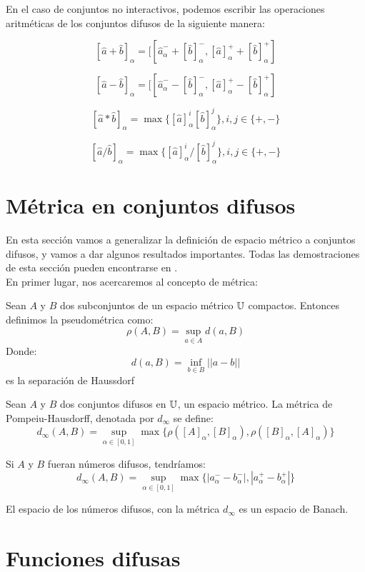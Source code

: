 \begin{ejemplo}
En el caso de conjuntos no interactivos, podemos escribir las operaciones aritméticas de los conjuntos difusos de la siguiente manera:

\[
[\hat{a} + \hat{b}]_\alpha = [[\hat{a}^-_\alpha + [\hat{b}]_\alpha^-, [\hat{a}]^+_\alpha + [\hat{b}]_\alpha^+]
\]

\[
[\hat{a} - \hat{b}]_\alpha = [[\hat{a}^-_\alpha - [\hat{b}]_\alpha^-, [\hat{a}]^+_\alpha - [\hat{b}]_\alpha^+]
\]

\[
[\hat{a} * \hat{b}]_\alpha = \max\{ [\hat{a}]_\alpha^i [\hat{b}]^j_\alpha \}, i, j \in \{+, -\}
\]

\[
[\hat{a} / \hat{b}]_\alpha = \max\{ [\hat{a}]_\alpha^i / [\hat{b}]^j_\alpha \}, i, j \in \{+, -\}
\]
\end{ejemplo}

\section{Métrica en conjuntos difusos}
En esta sección vamos a generalizar la definición de espacio métrico a conjuntos difusos, y vamos a dar algunos resultados importantes. Todas las demostraciones de esta sección pueden encontrarse en \cite{apuntesfuzzy}. \\
En primer lugar, nos acercaremos al concepto de métrica:

\begin{definicion}[Pseudométrica]
	Sean $A$ y $B$ dos subconjuntos de un espacio métrico $\mathbb U$ compactos. Entonces definimos la pseudométrica como:
	\[
		\rho(A, B) = \sup\limits_{a \in A} d(a, B)
	\]
	Donde:
	\[
		d(a, B) = \inf\limits_{b \in B} ||a-b||
	\]
	es la separación de Haussdorf
\end{definicion}

\begin{definicion}
	\label{def:metricadifusa}
	Sean $A$ y $B$ dos conjuntos difusos en $\mathbb U$, un espacio métrico. La métrica de Pompeiu-Hausdorff, denotada por $d_\infty$ se define:
	\[
		d_\infty(A, B) = \sup\limits_{\alpha \in [0, 1]} \max\{\rho([A]_\alpha, [B]_\alpha), \rho([B]_\alpha,  [A]_\alpha)\}
	\]
	
	Si $A$ y $B$ fueran números difusos, tendríamos:
	\[
		d_\infty(A, B) = \sup\limits_{\alpha \in [0, 1]} \max\{|a_\alpha^- - b_\alpha^-|, |a_\alpha^+ - b_\alpha^+|\}
	\]
\end{definicion}

\begin{teorema}
	\label{teorema:banach}
	El espacio de los números difusos, con la métrica $d_\infty$ es un espacio de Banach.
\end{teorema}

\section{Funciones difusas}